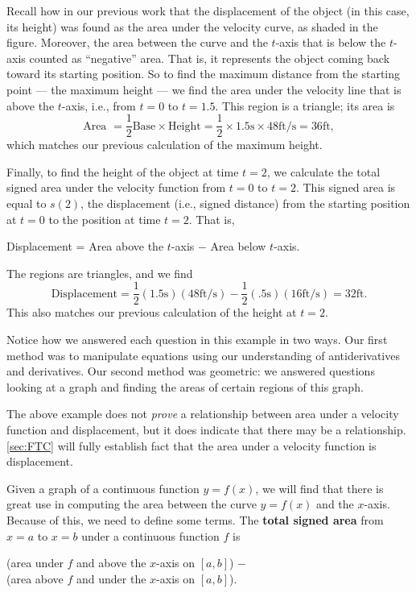 {Recall how in our previous work that the displacement of the object (in this case, its height) was found as the area under the velocity curve, as shaded in the figure. Moreover, the area between the curve and the $t$-axis that is below the $t$-axis counted as ``negative'' area. That is, it represents the object coming back toward its starting position. So to find the maximum distance from the starting point --- the maximum height --- we find the area under the velocity line that is above the $t$-axis, i.e., from $t=0$ to $t=1.5$. This region is a triangle; its area is 
\[\text{Area } = \frac12\text{Base} \times \text{Height} =\frac12\times 1.5\text{s}\times 48\text{ft/s} = 36\text{ft},\]
which matches our previous calculation of the maximum height.

Finally, to find the height of the object at time $t=2$, we calculate the total signed area under the velocity function from $t=0$ to $t=2$. This signed area is equal to $s(2)$, the displacement (i.e., signed distance) from the starting position at $t=0$ to the position at time $t=2$.
That is,
	\begin{center}
	Displacement = Area above the $t$-axis $-$ Area below $t$-axis.
	\end{center}
	The regions are triangles, and we find 
	\[\text{Displacement} = \frac12(1.5\text{s})(48\text{ft/s}) - \frac12(.5\text{s})(16\text{ft/s}) = 32\text{ft}.\]
This also matches our previous calculation of the height at $t=2$.

Notice how we answered each question in this example in two ways. Our first method was to manipulate equations using our understanding of antiderivatives and derivatives. Our second method was geometric: we answered questions looking at a graph and finding the areas of certain regions of this graph.}

The above example does not \textit{prove} a relationship between area under a velocity function and displacement, but it does indicate that there may be a relationship. \autoref{sec:FTC} will fully establish fact that the area under a velocity function is displacement.

Given a graph of a continuous function $y=f(x)$, we will find that there is great use in computing the area between the curve $y=f(x)$ and the $x$-axis. Because of this, we need to define some terms.  The \textbf{total signed area} from $x=a$ to $x=b$ under a continuous function $f$ is
\begin{center}
(area  under $f$ and above the $x$-axis on $[a,b]$) $-$ \quad\\
\qquad(area above $f$ and under the $x$-axis on $[a,b]$).
\end{center}

